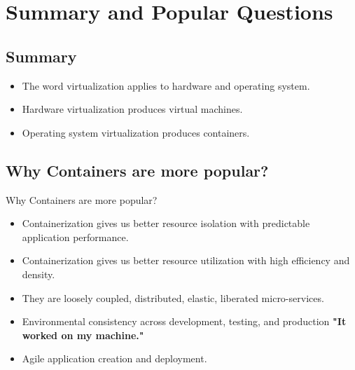
\section{Summary and Popular Questions}\label{sec:popular-questions}

\subsection{Summary}\label{subsec:summary}
\begin{frame}
    \begin{itemize}[<+- | alert@+>]
        \item The word virtualization applies to hardware and operating system.
        \item Hardware virtualization produces virtual machines.
        \item Operating system virtualization produces containers.
    \end{itemize}
\end{frame}

\subsection{Why Containers are more popular?}\label{subsec:containers-are-more-popular}
\begin{frame}{Why Containers are more popular?}
    \begin{itemize}[<+- | alert@+>]
        \item Containerization gives us better resource isolation with predictable application performance.
        \item Containerization gives us better resource utilization with high efficiency and density.
        \item They are loosely coupled, distributed, elastic, liberated micro-services.
        \item Environmental consistency across development, testing, and production \textbf{"It worked on my machine."}
        \item Agile application creation and deployment.
    \end{itemize}
\end{frame}

